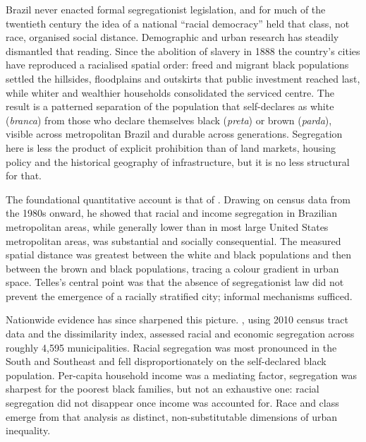 \documentclass[12pt,a4paper]{article}
\begin{document}
Brazil never enacted formal segregationist legislation, and for much of the twentieth century the idea of a national ``racial democracy'' held that class, not race, organised social distance. Demographic and urban research has steadily dismantled that reading. Since the abolition of slavery in 1888 the country's cities have reproduced a racialised spatial order: freed and migrant black populations settled the hillsides, floodplains and outskirts that public investment reached last, while whiter and wealthier households consolidated the serviced centre. The result is a patterned separation of the population that self-declares as white (\emph{branca}) from those who declare themselves black (\emph{preta}) or brown (\emph{parda}), visible across metropolitan Brazil and durable across generations. Segregation here is less the product of explicit prohibition than of land markets, housing policy and the historical geography of infrastructure, but it is no less structural for that.

The foundational quantitative account is that of \citet{telles2004race}. Drawing on census data from the 1980s onward, he showed that racial and income segregation in Brazilian metropolitan areas, while generally lower than in most large United States metropolitan areas, was substantial and socially consequential. The measured spatial distance was greatest between the white and black populations and then between the brown and black populations, tracing a colour gradient in urban space. Telles's central point was that the absence of segregationist law did not prevent the emergence of a racially stratified city; informal mechanisms sufficed.

Nationwide evidence has since sharpened this picture. \citet{deSouza2023nationwide_english}, using 2010 census tract data and the dissimilarity index, assessed racial and economic segregation across roughly 4{,}595 municipalities. Racial segregation was most pronounced in the South and Southeast and fell disproportionately on the self-declared black population. Per-capita household income was a mediating factor, segregation was sharpest for the poorest black families, but not an exhaustive one: racial segregation did not disappear once income was accounted for. Race and class emerge from that analysis as distinct, non-substitutable dimensions of urban inequality.
\end{document}
